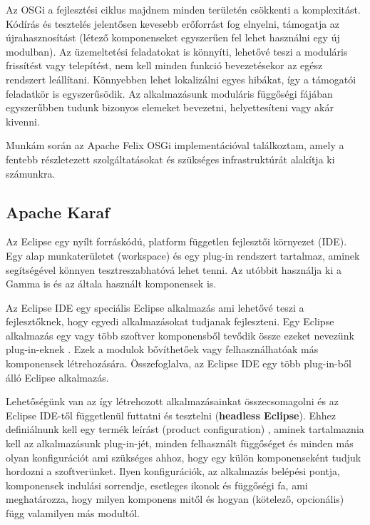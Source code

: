 Az OSGi a fejlesztési ciklus majdnem minden területén csökkenti a komplexitást. Kódírás és tesztelés jelentősen kevesebb erőforrást fog elnyelni, támogatja az újrahasznosítást (létező komponenseket egyszerűen fel lehet használni egy új modulban). Az üzemeltetési feladatokat is könnyíti, lehetővé teszi a moduláris frissítést vagy telepítést, nem kell minden funkció bevezetésekor az egész rendszert leállítani. Könnyebben lehet lokalizálni egyes hibákat, így a támogatói feladatkör is egyszerűsödik. Az alkalmazásunk moduláris függőségi fájában egyszerűbben tudunk bizonyos elemeket bevezetni, helyettesíteni vagy akár kivenni.

Munkám során az Apache Felix OSGi implementációval találkoztam, amely a fentebb részletezett szolgáltatásokat és szükséges infrastruktúrát alakítja ki számunkra.
\subsection{Apache Karaf}

Az Eclipse egy nyílt forráskódú, platform független fejlesztői környezet (IDE). Egy alap munkaterületet (workspace) és egy plug-in rendszert tartalmaz, aminek segítségével könnyen tesztreszabhatóvá lehet tenni. Az utóbbit használja ki a Gamma is és az általa használt komponensek is. 

Az Eclipse IDE egy speciális Eclipse alkalmazás ami lehetővé teszi a fejlesztőknek, hogy egyedi alkalmazásokat tudjanak fejleszteni. Egy Eclipse alkalmazás egy vagy több szoftver komponensből tevődik össze ezeket nevezünk plug-in-eknek \cite{plugin}. Ezek a modulok bővíthetőek vagy felhasználhatóak más komponensek létrehozására. Összefoglalva, az Eclipse IDE egy több plug-in-ből álló Eclipse alkalmazás.

Lehetőségünk van az így létrehozott alkalmazásainkat összecsomagolni és az Eclipse IDE-től függetlenül futtatni és tesztelni (\textbf{headless Eclipse}).
Ehhez definiálnunk kell egy termék leírást (product configuration) \cite{product}, aminek tartalmaznia kell az alkalmazásunk plug-in-jét, minden felhasznált függőséget és minden más olyan konfigurációt ami szükséges ahhoz, hogy egy külön komponenseként tudjuk hordozni a szoftverünket. Ilyen konfigurációk, az alkalmazás belépési pontja, komponensek indulási sorrendje, esetleges ikonok és függőségi fa, ami meghatározza, hogy milyen komponens mitől és hogyan (kötelező, opcionális) függ valamilyen más modultól.

